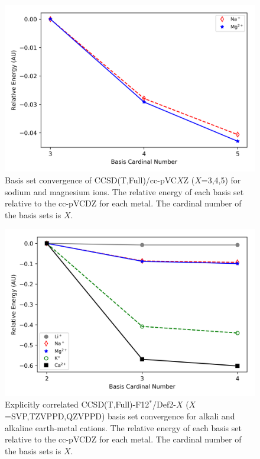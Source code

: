 \begin{figure}[!htbp]
  \centering
    \includegraphics[width=\textwidth]{figures/ap_pes_metals}
    \caption[Basis set convergence for sodium and magnesium ions with core-correlation basis sets.]{Basis set convergence of CCSD(T,Full)/cc-pVC$X$Z ($X$=3,4,5) for sodium and magnesium ions. The relative energy of each basis set relative to the cc-pVCDZ for each metal. The cardinal number of the basis sets is $X$.}
  \label{fig:ap_pes_metals}
\end{figure}



\begin{figure}[!htbp]
  \centering
    \includegraphics[width=\textwidth]{figures/ap_metals_explicit}
    \caption[Explicitly correlated basis set convergence for alkali and alkaline earth-metal cations.]{Explicitly correlated CCSD(T,Full)-F12$^*$/Def2-$X$ ($X$=SVP,TZVPPD,QZVPPD) basis set convergence for alkali and alkaline earth-metal cations. The relative energy of each basis set relative to the cc-pVCDZ for each metal. The cardinal number of the basis sets is $X$.}
  \label{fig:ap_metals_explicit}
\end{figure}
